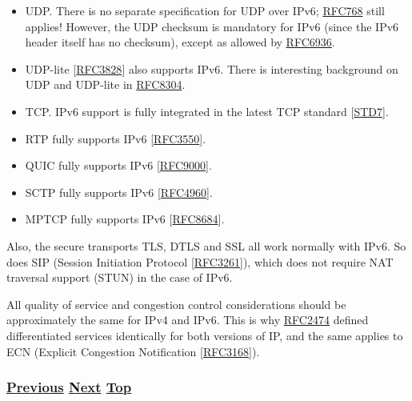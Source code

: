 \documentclass[
]{article}
\begin{document}
\begin{itemize}
\item
  UDP. There is no separate specification for UDP over IPv6;
  \href{https://www.rfc-editor.org/info/rfc768}{RFC768} still applies!
  However, the UDP checksum is mandatory for IPv6 (since the IPv6 header
  itself has no checksum), except as allowed by
  \href{https://www.rfc-editor.org/info/rfc6936}{RFC6936}.
\item
  UDP-lite {[}\href{https://www.rfc-editor.org/info/rfc3828}{RFC3828}{]}
  also supports IPv6. There is interesting background on UDP and
  UDP-lite in \href{https://www.rfc-editor.org/info/rfc8304}{RFC8304}.
\item
  TCP. IPv6 support is fully integrated in the latest TCP standard
  {[}\href{https://www.rfc-editor.org/info/std7}{STD7}{]}.
\item
  RTP fully supports IPv6
  {[}\href{https://www.rfc-editor.org/info/rfc3550}{RFC3550}{]}.
\item
  QUIC fully supports IPv6
  {[}\href{https://www.rfc-editor.org/info/rfc9000}{RFC9000}{]}.
\item
  SCTP fully supports IPv6
  {[}\href{https://www.rfc-editor.org/info/rfc4960}{RFC4960}{]}.
\item
  MPTCP fully supports IPv6
  {[}\href{https://www.rfc-editor.org/info/rfc8684}{RFC8684}{]}.
\end{itemize}

Also, the secure transports TLS, DTLS and SSL all work normally with
IPv6. So does SIP (Session Initiation Protocol
{[}\href{https://www.rfc-editor.org/info/rfc3261}{RFC3261}{]}), which
does not require NAT traversal support (STUN) in the case of IPv6.

All quality of service and congestion control considerations should be
approximately the same for IPv4 and IPv6. This is why
\href{https://www.rfc-editor.org/info/rfc2474}{RFC2474} defined
differentiated services identically for both versions of IP, and the
same applies to ECN (Explicit Congestion Notification
{[}\href{https://www.rfc-editor.org/info/rfc3168}{RFC3168}{]}).

\subsubsection{\texorpdfstring{\hyperref[routing]{Previous}
\hyperref[extension-headers-and-options]{Next}
\hyperref[ipv6-basic-technology]{Top}}{Previous Next Top}}\label{previous-next-top-14}

\pagebreak
\end{document}
